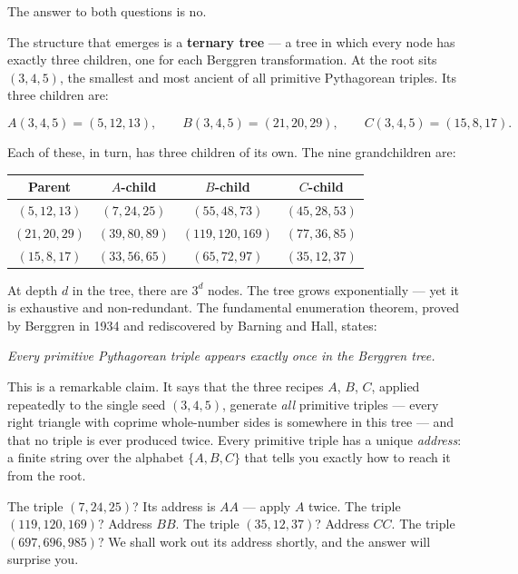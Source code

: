 The answer to both questions is no.

The structure that emerges is a \textbf{ternary tree} --- a tree in which every node has exactly three children, one for each Berggren transformation. At the root sits $(3, 4, 5)$, the smallest and most ancient of all primitive Pythagorean triples. Its three children are:

\[
A(3,4,5) = (5, 12, 13), \qquad B(3,4,5) = (21, 20, 29), \qquad C(3,4,5) = (15, 8, 17).
\]

Each of these, in turn, has three children of its own. The nine grandchildren are:

\begin{center}
\small
\begin{tabular}{c c c c}
\toprule
Parent & $A$-child & $B$-child & $C$-child \\
\midrule
$(5, 12, 13)$ & $(7, 24, 25)$ & $(55, 48, 73)$ & $(45, 28, 53)$ \\
$(21, 20, 29)$ & $(39, 80, 89)$ & $(119, 120, 169)$ & $(77, 36, 85)$ \\
$(15, 8, 17)$ & $(33, 56, 65)$ & $(65, 72, 97)$ & $(35, 12, 37)$ \\
\bottomrule
\end{tabular}
\end{center}

At depth $d$ in the tree, there are $3^d$ nodes. The tree grows exponentially --- yet it is exhaustive and non-redundant. The fundamental enumeration theorem, proved by Berggren in 1934 and rediscovered by Barning and Hall, states:


\begin{displayquote}
\textit{Every primitive Pythagorean triple appears exactly once in the Berggren tree.}
\end{displayquote}


This is a remarkable claim. It says that the three recipes $A$, $B$, $C$, applied repeatedly to the single seed $(3, 4, 5)$, generate \textit{all} primitive triples --- every right triangle with coprime whole-number sides is somewhere in this tree --- and that no triple is ever produced twice. Every primitive triple has a unique \textit{address}: a finite string over the alphabet $\{A, B, C\}$ that tells you exactly how to reach it from the root.

The triple $(7, 24, 25)$? Its address is $AA$ --- apply $A$ twice. The triple $(119, 120, 169)$? Address $BB$. The triple $(35, 12, 37)$? Address $CC$. The triple $(697, 696, 985)$? We shall work out its address shortly, and the answer will surprise you.


